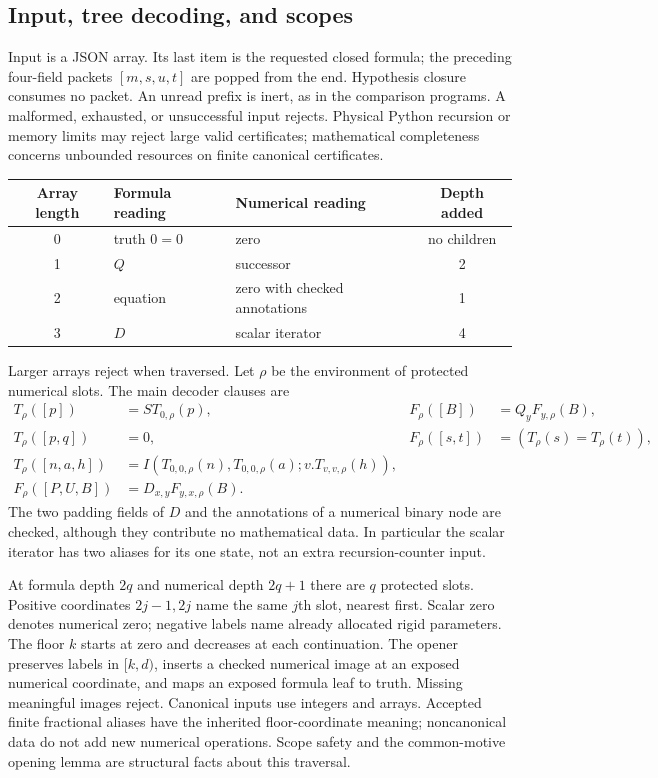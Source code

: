 \documentclass[11pt,letterpaper]{article}
\theoremstyle{definition}\newtheorem{definition}[theorem]{Definition}
\theoremstyle{remark}\newtheorem{remark}[theorem]{Remark}
\begin{document}
\subsection{Input, tree decoding, and scopes}

Input is a JSON array. Its last item is the requested closed formula;
the preceding four-field packets $[m,s,u,t]$ are popped from the end.
Hypothesis closure consumes no packet. An unread prefix is inert, as in
the comparison programs. A malformed, exhausted, or unsuccessful input
rejects. Physical Python recursion or memory limits may reject large
valid certificates; mathematical completeness concerns unbounded
resources on finite canonical certificates.

\begin{center}\small
\begin{tabular}{cllc}
\toprule
Array length & Formula reading & Numerical reading & Depth added\\
\midrule
0 & truth $0=0$ & zero & no children\\
1 & $Q$ & successor &2\\
2 & equation & zero with checked annotations &1\\
3 & $D$ & scalar iterator &4\\
\bottomrule
\end{tabular}
\end{center}
Larger arrays reject when traversed. Let $\rho$ be the environment of
protected numerical slots. The main decoder clauses are
\begin{align*}
 T_\rho([p])&=S T_{0,\rho}(p),&
 F_\rho([B])&=Q_yF_{y,\rho}(B),\\
 T_\rho([p,q])&=0,&
 F_\rho([s,t])&=(T_\rho(s)=T_\rho(t)),\\
 T_\rho([n,a,h])&=I(T_{0,0,\rho}(n),T_{0,0,\rho}(a);
                         v.T_{v,v,\rho}(h)),\\
 F_\rho([P,U,B])&=D_{x,y}F_{y,x,\rho}(B).
\end{align*}
The two padding fields of $D$ and the annotations of a numerical binary
node are checked, although they contribute no mathematical data. In
particular the scalar iterator has two aliases for its one state, not
an extra recursion-counter input.

At formula depth $2q$ and numerical depth $2q+1$ there are $q$ protected
slots. Positive coordinates $2j-1,2j$ name the same $j$th slot, nearest
first. Scalar zero denotes numerical zero; negative labels name already
allocated rigid parameters. The floor $k$ starts at zero and decreases
at each continuation. The opener preserves labels in $[k,d)$, inserts a
checked numerical image at an exposed numerical coordinate, and maps an
exposed formula leaf to truth. Missing meaningful images reject.
Canonical inputs use integers and arrays. Accepted finite fractional
aliases have the inherited floor-coordinate meaning; noncanonical data
do not add new numerical operations. Scope safety and the common-motive
opening lemma are structural facts about this traversal.
\end{document}
